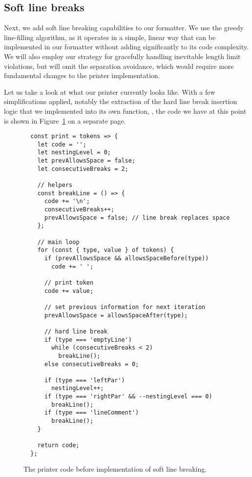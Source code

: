 \subsection{Soft line breaks}
Next, we add soft line breaking capabilities to our formatter.
We use the greedy line-filling algorithm,
as it operates in a simple, linear way
that can be implemented in our formatter without
adding significantly to its code complexity.
We will also employ our strategy for
gracefully handling inevitable length limit violations,
but will omit the separation avoidance,
which would require more fundamental changes
to the printer implementation.

Let us take a look at what our printer currently looks like.
With a few simplifications applied,
notably the extraction of the hard line break insertion logic
that we implemented into its own function, ,
the code we have at this point is shown
in Figure~\ref{fig:printerBeforeSoftLineBreaks} on a separate page.

\begin{figure}[p]
  \begin{verbatim}
  const print = tokens => {
    let code = '';
    let nestingLevel = 0;
    let prevAllowsSpace = false;
    let consecutiveBreaks = 2;

    // helpers
    const breakLine = () => {
      code += '\n';
      consecutiveBreaks++;
      prevAllowsSpace = false; // line break replaces space
    };

    // main loop
    for (const { type, value } of tokens) {
      if (prevAllowsSpace && allowsSpaceBefore(type))
        code += ' ';

      // print token
      code += value;

      // set previous information for next iteration
      prevAllowsSpace = allowsSpaceAfter(type);

      // hard line break
      if (type === 'emptyLine')
        while (consecutiveBreaks < 2)
          breakLine();
      else consecutiveBreaks = 0;

      if (type === 'leftPar')
        nestingLevel++;
      if (type === 'rightPar' && --nestingLevel === 0)
        breakLine();
      if (type === 'lineComment')
        breakLine();
    }

    return code;
  };
  \end{verbatim}
  \caption{The printer code before implementation of
    soft line breaking.}\label{fig:printerBeforeSoftLineBreaks}
\end{figure}

